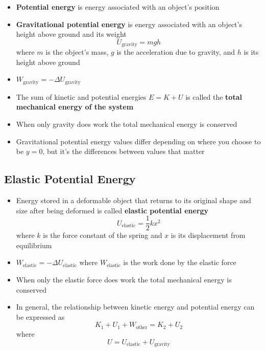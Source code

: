 \documentclass{article}
\begin{document}
\begin{itemize}
  \item \textbf{Potential energy} is energy associated with an object's position

  \item \textbf{Gravitational potential energy} is energy associated with an object's height above ground and its weight \[U_\textrm{gravity}=mgh\] where $m$ is the object's mass, $g$ is the acceleration due to gravity, and $h$ is its height above ground

  \item $W_\textrm{gravity}=-\Delta U_\textrm{gravity}$

  \item The sum of kinetic and potential energies $E=K+U$ is called the \textbf{total mechanical energy of the system}

  \item When only gravity does work the total mechanical energy is conserved

  \item Gravitational potential energy values differ depending on where you choose to be $y=0$, but it's the differences between values that matter
\end{itemize}

\subsection{Elastic Potential Energy}

\begin{itemize}
  \item Energy stored in a deformable object that returns to its original shape and size after being deformed is called \textbf{elastic potential energy} \[U_\textrm{elastic}=\frac{1}{2}kx^2\] where $k$ is the force constant of the spring and $x$ is its displacement from equilibrium

  \item $W_\textrm{elastic}=-\Delta U_\textrm{elastic}$ where $W_\textrm{elastic}$ is the work done by the elastic force

  \item When only the elastic force does work the total mechanical energy is conserved

  \item In general, the relationship between kinetic energy and potential energy can be expressed as \[K_1+U_1+W_\textrm{other}=K_2+U_2\] where \[U=U_\textrm{elastic}+U_\textrm{gravity}\]
\end{itemize}
\end{document}
